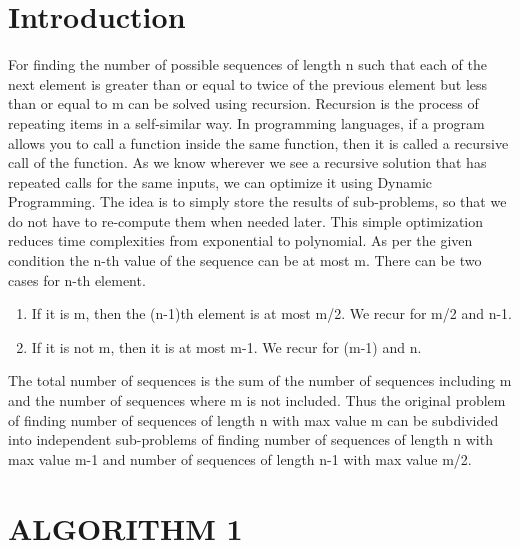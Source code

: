 \documentclass[conference]{IEEEtran}
\begin{document}
\section{Introduction}
For finding the number of possible sequences of length n such that each of the next element is greater than or equal to twice of the previous element but less than or equal to m can be solved using recursion.
Recursion is the process of repeating items in a self-similar way. In programming languages, if a program allows you to call a function inside the same function, then it is called a recursive call of the function.
\newline
As we know wherever we see a recursive solution that has repeated calls for the same inputs, we can optimize it using Dynamic Programming.
The idea is to simply store the results of sub-problems, so that we do not have to re-compute them when needed later. This simple optimization reduces time complexities from exponential to polynomial.
\newline
As per the given condition the n-th value of the sequence can be at most m. There can be two cases for n-th element.
\begin{enumerate}
\item If it is m, then the (n-1)th element is at most m/2. We recur for m/2 and n-1.
\item If it is not m, then it is at most m-1. We recur for (m-1) and n.
\end{enumerate}
The total number of sequences is the sum of the number of sequences including m and the number of sequences where m is not included. Thus the original problem of finding number of sequences of length n with max value m can be subdivided into independent sub-problems of finding number of sequences of length n with max value m-1 and number of sequences of length n-1 with max value m/2.

\section{ALGORITHM 1}
\end{document}
